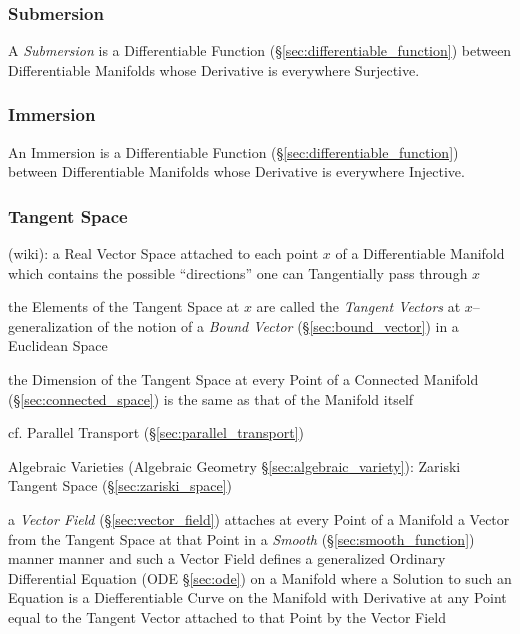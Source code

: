 \subsubsection{Submersion}\label{sec:submersion}

A \emph{Submersion} is a Differentiable Function
(\S\ref{sec:differentiable_function}) between Differentiable Manifolds
whose Derivative is everywhere Surjective.



\subsubsection{Immersion}\label{sec:immersion}

An Immersion is a Differentiable Function
(\S\ref{sec:differentiable_function}) between Differentiable Manifolds
whose Derivative is everywhere Injective.



\subsubsection{Tangent Space}\label{sec:tangent_space}

(wiki): a Real Vector Space attached to each point $x$ of a Differentiable
Manifold which contains the possible ``directions'' one can Tangentially pass
through $x$

the Elements of the Tangent Space at $x$ are called the \emph{Tangent Vectors}
at $x$-- generalization of the notion of a \emph{Bound Vector}
(\S\ref{sec:bound_vector}) in a Euclidean Space

the Dimension of the Tangent Space at every Point of a Connected Manifold
(\S\ref{sec:connected_space}) is the same as that of the Manifold itself

\fist cf. Parallel Transport (\S\ref{sec:parallel_transport})

\fist Algebraic Varieties (Algebraic Geometry \S\ref{sec:algebraic_variety}):
Zariski Tangent Space (\S\ref{sec:zariski_space})

a \emph{Vector Field} (\S\ref{sec:vector_field}) attaches at every Point of a
Manifold a Vector from the Tangent Space at that Point in a \emph{Smooth}
(\S\ref{sec:smooth_function}) manner manner and such a Vector Field defines a
generalized Ordinary Differential Equation (ODE \S\ref{sec:ode}) on a Manifold
where a Solution to such an Equation is a Diefferentiable Curve on the Manifold
with Derivative at any Point equal to the Tangent Vector attached to that Point
by the Vector Field

